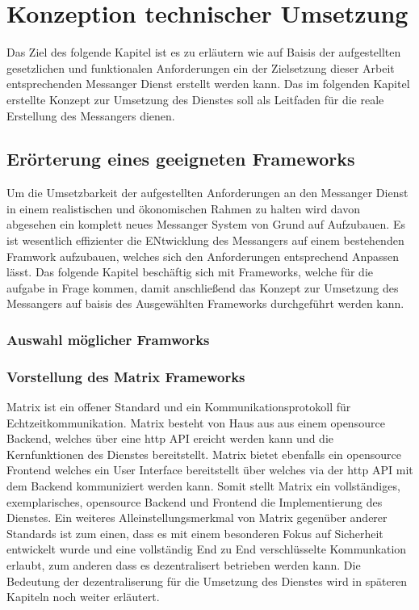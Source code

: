 \chapter{Konzeption technischer Umsetzung}\label{chapter:tanforderungen}
Das Ziel des folgende Kapitel ist es zu erläutern wie auf Baisis der aufgestellten gesetzlichen und funktionalen Anforderungen ein der Zielsetzung dieser Arbeit entsprechenden Messanger Dienst erstellt werden kann. Das im folgenden Kapitel erstellte Konzept zur Umsetzung des Dienstes soll als Leitfaden für die reale Erstellung des Messangers dienen. 

\section{Erörterung eines geeigneten Frameworks}\label{chapter:kr}
Um die Umsetzbarkeit der aufgestellten Anforderungen an den Messanger Dienst in einem realistischen und ökonomischen Rahmen zu halten wird davon abgesehen ein komplett neues Messanger System von Grund auf Aufzubauen. Es ist wesentlich effizienter die ENtwicklung des Messangers auf einem bestehenden Framwork aufzubauen, welches sich den Anforderungen entsprechend Anpassen lässt. Das folgende Kapitel beschäftig sich mit Frameworks, welche für die aufgabe in Frage kommen, damit anschließend das Konzept zur Umsetzung des Messangers auf baisis des Ausgewählten Frameworks durchgeführt werden kann. 

\subsection{Auswahl möglicher Framworks}\label{chapter:am}

\subsection{Vorstellung des Matrix Frameworks}\label{chapter:vdmf}
Matrix ist ein offener Standard und ein Kommunikationsprotokoll für  Echtzeitkommunikation. Matrix besteht von Haus aus aus einem opensource Backend, welches über eine http API ereicht werden kann und die Kernfunktionen des Dienstes bereitstellt. Matrix bietet ebenfalls ein opensource Frontend welches ein User Interface bereitstellt über welches via der http API mit dem Backend kommuniziert werden kann. Somit stellt Matrix ein vollständiges, exemplarisches, opensource Backend und Frontend die Implementierung des Dienstes. Ein weiteres Alleinstellungsmerkmal von Matrix gegenüber anderer Standards ist zum einen, dass es mit einem besonderen Fokus auf Sicherheit entwickelt wurde und eine vollständig End zu End verschlüsselte Kommunkation  erlaubt, zum anderen dass es dezentralisert betrieben werden kann. Die Bedeutung der dezentraliserung für die Umsetzung des Dienstes wird in späteren Kapiteln noch weiter erläutert.

